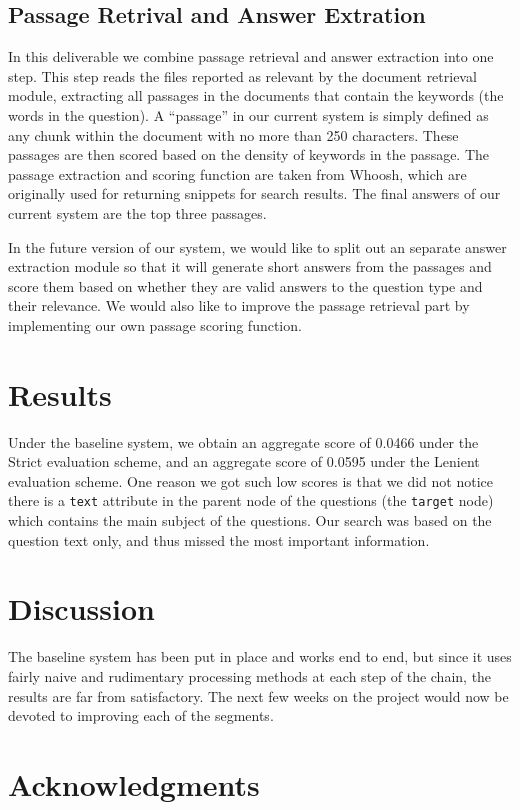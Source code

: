 \documentclass[11pt]{article}
\begin{document}
\subsection{Passage Retrival and Answer Extration}
In this deliverable we combine passage retrieval and answer extraction into one step. This step reads the files reported as relevant by the document retrieval module, extracting all passages in the documents that contain the keywords (the words in the question). A ``passage'' in our current system is simply defined as any chunk within the document with no more than 250 characters. These passages are then scored based on the density of keywords in the passage. The passage extraction and scoring function are taken from Whoosh, which are originally used for returning snippets for search results. The final answers of our current system are the top three passages.

In the future version of our system, we would like to split out an separate answer extraction module so that it will generate short answers from the passages and score them based on whether they are valid answers to the question type and their relevance. We would also like to improve the passage retrieval part by implementing our own passage scoring function.

\section{Results}

Under the baseline system, we obtain an aggregate score of 0.0466 under the Strict evaluation scheme, and an aggregate score of 0.0595 under the Lenient evaluation scheme.
One reason we got such low scores is that we did not notice there is a \texttt{text} attribute in the parent node of the questions (the \texttt{target} node) which contains the main subject of the questions. Our search was based on the question text only, and thus missed the most important information.

\section{Discussion}
\label{sec:discussion}

The baseline system has been put in place and works end to end, but since it uses fairly naive and rudimentary processing methods at each step of the chain, the results are far from satisfactory. The next few weeks on the project would now be devoted to improving each of the segments. 
\section*{Acknowledgments}


\printbibliography 
\end{document}
